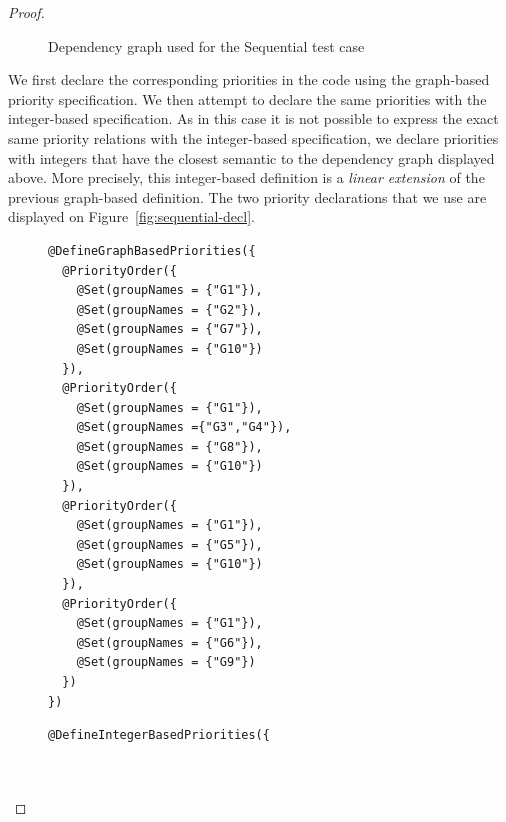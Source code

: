 \documentclass[11pt]{report}
\begin{document}
\begin{proof}
\begin{figure}[!ht]
      \caption{Dependency graph used for the Sequential test case}
      \label{fig:complex} 
\end{figure}

We first declare the corresponding priorities in the code using the graph-based priority specification. We then attempt to declare the same priorities with the integer-based specification. As in this case it is not possible to express the exact same priority relations with the integer-based specification, we declare priorities with integers that have the closest semantic to the dependency graph displayed above. More precisely, this integer-based definition is a \emph{linear extension} of the previous graph-based definition. The two priority declarations that we use are displayed on Figure~\ref{fig:sequential-decl}.

\begin{figure}[!ht]
	\lstset{language=java, numberstyle=\tiny, stepnumber=1, numbersep=5pt, basicstyle=\footnotesize}
	\begin{minipage}{0.41\textwidth}
	\begin{lstlisting}[frame=single]
@DefineGraphBasedPriorities({
  @PriorityOrder({
    @Set(groupNames = {"G1"}),
    @Set(groupNames = {"G2"}),
    @Set(groupNames = {"G7"}),
    @Set(groupNames = {"G10"})
  }),
  @PriorityOrder({
    @Set(groupNames = {"G1"}),
    @Set(groupNames ={"G3","G4"}),
    @Set(groupNames = {"G8"}),
    @Set(groupNames = {"G10"})
  }),
  @PriorityOrder({
    @Set(groupNames = {"G1"}),
    @Set(groupNames = {"G5"}),
    @Set(groupNames = {"G10"})
  }),
  @PriorityOrder({
    @Set(groupNames = {"G1"}),
    @Set(groupNames = {"G6"}),
    @Set(groupNames = {"G9"})
  })
})
 	\end{lstlisting}
 	\end{minipage}
 	\nointerlineskip
	\begin{minipage}{0.57\textwidth}
	\begin{lstlisting}[frame=single]
@DefineIntegerBasedPriorities({



\end{lstlisting}
\end{minipage}
\end{figure}
\end{proof}
\end{document}
